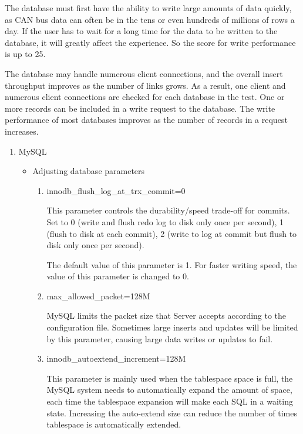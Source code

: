 The database must first have the ability to write large amounts of data quickly, as CAN bus data can often be in the tens or even hundreds of millions of rows a day. If the user has to wait for a long time for the data to be written to the database, it will greatly affect the experience. So the score for write performance is up to 25.

The database may handle numerous client connections, and the overall insert throughput improves as the number of links grows. As a result, one client and numerous client connections are checked for each database in the test. One or more records can be included in a write request to the database. The write performance of most databases improves as the number of records in a request increases.

\begin{enumerate}
\item MySQL

\begin{itemize}
    
\item Adjusting database parameters

\begin{enumerate}
\item innodb\_flush\_log\_at\_trx\_commit=0

This parameter controls the durability/speed trade-off for commits. Set to 0 (write and flush redo log to disk only once per second), 1 (flush to disk at each commit), 2 (write to log at commit but flush to disk only once per second)\cite{mariadb}. 

The default value of this parameter is 1. For faster writing speed, the value of this parameter is changed to 0.
\item max\_allowed\_packet=128M

MySQL limits the packet size that Server accepts according to the configuration file. Sometimes large inserts and updates will be limited by this parameter, causing large data writes or updates to fail.

\item innodb\_autoextend\_increment=128M

This parameter is mainly used when the tablespace space is full, the MySQL system needs to automatically expand the amount of space, each time the tablespace expansion will make each SQL in a waiting state. Increasing the auto-extend size can reduce the number of times tablespace is automatically extended\cite{mariadb_autoextend}.


\end{enumerate}
\end{itemize}
\end{enumerate}
